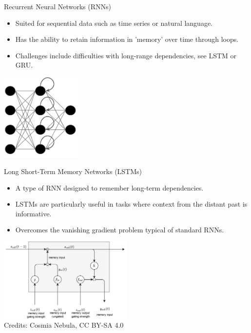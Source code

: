 \documentclass[aspectratio=169]{../latex_main/tntbeamer}  %
\begin{document}
        \begin{frame}{Recurrent Neural Networks (RNNs)}
        \begin{itemize}
            \item Suited for sequential data such as time series or natural language.
            \item Has the ability to retain information in 'memory' over time through loops.
            \item Challenges include difficulties with long-range dependencies, see LSTM or GRU.
        \end{itemize}
        \centering
        \includegraphics[width=0.3\textwidth]{figures/rnn.png}
        \end{frame}

        \begin{frame}{Long Short-Term Memory Networks (LSTMs)}
        \begin{itemize}
            \item A type of RNN designed to remember long-term dependencies.
            \item LSTMs are particularly useful in tasks where context from the distant past is informative.
            \item Overcomes the vanishing gradient problem typical of standard RNNs.
        \end{itemize}
        \centering
        \includegraphics[width=0.5\textwidth]{figures/lstm.png}\\
        Credits: Cosmia Nebula, CC BY-SA 4.0
        \end{frame}




 	
\end{document}
